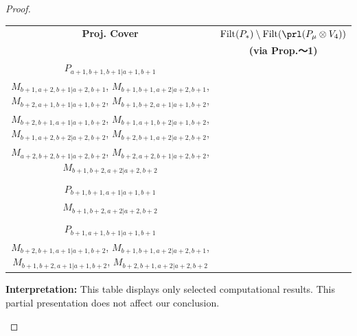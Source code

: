 \begin{proof}
\begin{enumerate}
\begin{enumerate}
\begin{table}[htbp]
\begin{tabular}{cc}
\toprule
\textbf{Proj. Cover} & \textbf{$\operatorname{Filt}(P_*) \setminus \operatorname{Filt}(\prl(P_\mu \otimes V_{4})) $}  \\
     & \textbf{(via Prop.～1)}  \\
\midrule
 $P_{a+1,b+1,b+1|a+1,b+1}$ & \makecell{
 $M_{a+2,b+1,b+1|a+2,b+1}$,
 $M_{a+1,b+2,b+1|a+1,b+2}$,
 $M_{a+1,b+1,b+2|a+1,b+2}$,
 $M_{a+2,b+1,b+2|a+2,b+2}$, \\
 $M_{b+1,a+2,b+1|a+2,b+1}$,
 $M_{b+1,b+1,a+2|a+2,b+1}$,
 $M_{b+2,a+1,b+1|a+1,b+2}$,
 $M_{b+1,b+2,a+1|a+1,b+2}$, \\
 $M_{b+2,b+1,a+1|a+1,b+2}$,
 $M_{b+1,a+1,b+2|a+1,b+2}$,
 $M_{b+1,a+2,b+2|a+2,b+2}$,
 $M_{b+2,b+1,a+2|a+2,b+2}$, \\
 $M_{a+2,b+2,b+1|a+2,b+2}$,
 $M_{b+2,a+2,b+1|a+2,b+2}$,
 $M_{b+1,b+2,a+2|a+2,b+2}$
}\\
 & \\
 $P_{b+1,b+1,a+1|a+1,b+1}$ & \makecell{
 $M_{b+2,b+1,a+1|a+1,b+2}$,
 $M_{b+1,b+2,a+1|a+1,b+2}$,
 $M_{b+1,b+1,a+2|a+2,b+1}$,
 $M_{b+2,b+1,a+2|a+2,b+2}$, \\
 $M_{b+1,b+2,a+2|a+2,b+2}$
}\\
 & \\
 $P_{b+1,a+1,b+1|a+1,b+1}$ & \makecell{
 $M_{b+2,a+1,b+1|a+1,b+2}$,
 $M_{b+1,a+2,b+1|a+2,b+1}$,
 $M_{b+1,a+1,b+2|a+1,b+2}$,
 $M_{b+2,a+2,b+1|a+2,b+2}$, \\
 $M_{b+2,b+1,a+1|a+1,b+2}$,
 $M_{b+1,b+1,a+2|a+2,b+1}$,
 $M_{b+1,b+2,a+1|a+1,b+2}$,
 $M_{b+2,b+1,a+2|a+2,b+2}$
}\\
\bottomrule
\end{tabular}
\vspace{0.5em}
\parbox{\linewidth}{\small
\textbf{Interpretation:}
This table displays only selected computational results. This partial presentation does not affect our conclusion.
}
\end{table}


\end{enumerate}
\end{enumerate}
\end{proof}
